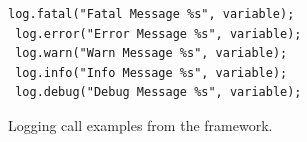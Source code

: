 \begin{figure}[H]
\vspace*{1em}
\begin{center}
\begin{minipage}{3.5in}
\begin{lstlisting}[frame=single,numbers=none]
 log.fatal("Fatal Message %s", variable);
 log.error("Error Message %s", variable);
 log.warn("Warn Message %s", variable);
 log.info("Info Message %s", variable);
 log.debug("Debug Message %s", variable);
\end{lstlisting}
\end{minipage}
\caption{Logging call examples from the \protect{} framework.\label{fig:chap1_logCode}\label{fig:log-call-examples}}
\end{center}
\end{figure}

%
%
%



